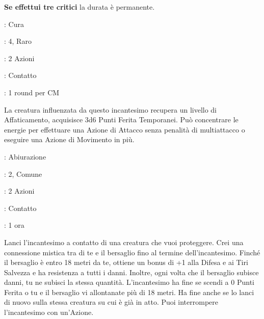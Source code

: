 \begin{multicols}{2}
\textbf{Se effettui tre critici} la durata è permanente.

\noindent\colorbox{OBSSgold!10}{
\begin{minipage}{0.95\linewidth}
\begin{description}[noitemsep, topsep=0pt, parsep=0pt, partopsep=0pt, leftmargin=0cm, labelwidth=1.3cm]
	\item[\textbf{Lista}]: Cura
	\item[\textbf{Livello}]: 4, Raro
	\item[\textbf{Lancio}]: 2 Azioni
	\item[\textbf{Gittata}]: Contatto
	\item[\textbf{Durata}]: 1 round per CM
\end{description}
\end{minipage}}\smallskip

La creatura influenzata da questo incantesimo recupera un livello di Affaticamento, acquisisce 3d6 Punti Ferita Temporanei. Può concentrare le energie per effettuare una Azione di Attacco senza penalità di multiattacco o eseguire una Azione di Movimento in più.

\noindent\colorbox{OBSSgold!10}{
\begin{minipage}{0.95\linewidth}
\begin{description}[noitemsep, topsep=0pt, parsep=0pt, partopsep=0pt, leftmargin=0cm, labelwidth=1.3cm]
	\item[\textbf{Lista}]: Abiurazione
	\item[\textbf{Livello}]: 2, Comune
	\item[\textbf{Lancio}]: 2 Azioni
	\item[\textbf{Gittata}]: Contatto
	\item[\textbf{Durata}]: 1 ora
\end{description}
\end{minipage}}\smallskip

Lanci l'incantesimo a contatto di una creatura che vuoi proteggere. Crei una connessione mistica tra di te e il bersaglio fino al termine dell'incantesimo. Finché il bersaglio è entro 18 metri da te, ottiene un bonus di +1 alla Difesa e ai Tiri Salvezza e ha resistenza a tutti i danni. Inoltre, ogni volta che il bersaglio subisce danni, tu ne subisci la stessa quantità. L'incantesimo ha fine se scendi a 0 Punti Ferita o tu e il bersaglio vi allontanate più di 18 metri. Ha fine anche se lo lanci di nuovo sulla stessa creatura su cui è già in atto. Puoi interrompere l'incantesimo con un'Azione.


\end{multicols}

